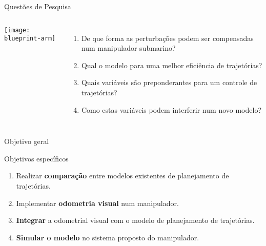 \begin{frame}[c]{Questões de Pesquisa}
    \transboxout[duration=0.5]
    \begin{columns}
            \texttt{[image: blueprint-arm]}
            \begin{enumerate}
                \item De que forma as perturbações podem ser compensadas num manipulador submarino?
                \item Qual o modelo para uma melhor eficiência de trajetórias?
                \item Quais variáveis são preponderantes para um controle de trajetórias?
                \item Como estas variáveis podem interferir num novo modelo?
            \end{enumerate}
    \end{columns}
\end{frame}
\begin{frame}[c]{Objetivo geral}
\end{frame}
\begin{frame}[c]{Objetivos específicos}
    \centering
    \begin{enumerate}
        \item Realizar \textbf{comparação} entre modelos existentes de planejamento de trajetórias.
        \item Implementar \textbf{odometria visual} num manipulador.
        \item \textbf{Integrar} a odometrial visual com o modelo de planejamento de trajetórias.
        \item \textbf{Simular o modelo} no sistema proposto do manipulador.
    \end{enumerate}
\end{frame}
